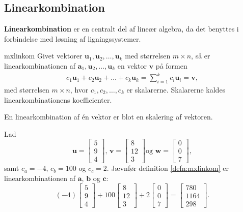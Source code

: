 \subsection{Linearkombination}
%
\textbf{Linearkombination} er en centralt del af lineær algebra, da det benyttes i forbindelse med løsning af ligningssystemer. 
%
\begin{defn}{}{mxlinkom}
Givet vektorer $\mathbf{u}_1, \mathbf{u}_2, \ldots, \mathbf{u}_k$ med størrelsen $m \times n$, så er linearkombinationen af $\mathbf{a}_1, \mathbf{u}_2, \ldots, \mathbf{u}_k$ en vektor $\mathbf{v}$ på formen 
%
\begin{align*}
c_1\mathbf{u}_1+c_2\mathbf{u}_2+\ldots+c_k\mathbf{u}_k=\sum\limits_{i=1}^k c_i\mathbf{u}_i=\mathbf{v},
\end{align*}
%
med størrelsen $m \times n$, hvor $c_1, c_2, \ldots, c_k$ er skalarerne.
Skalarerne kaldes linearkombinationens koefficienter.
\end{defn}
%
%
\noindent 
%
En linearkombination af én vektor er blot en skalering af vektoren.
\\
%
%
\begin{eks}
Lad 
$$
\textbf{u}=
\begin{bmatrix}
5 \\
9 \\
4
\end{bmatrix}
\text{, }
\textbf{v}=
\begin{bmatrix}
8  \\
12 \\ 
3
\end{bmatrix}
\text{og }
\textbf{w}=
\begin{bmatrix}
0 \\
0 \\
7
\end{bmatrix},
$$
samt $c_a=-4$, $c_b=100$ og $c_c=2$. 
Jævnfør definition \ref{defn:mxlinkom} er linearkombinationen af $\textbf{a}$, $\textbf{b}$ og $\textbf{c}$:
$$
(-4)
\begin{bmatrix}
5 \\ 
9 \\ 
4
\end{bmatrix}
+
100
\begin{bmatrix}
8 \\
12 \\ 
3
\end{bmatrix}
+
2
\begin{bmatrix}
0 \\
0 \\ 
7
\end{bmatrix}
=
\begin{bmatrix}
780 \\
1164 \\ 
298
\end{bmatrix}
\text{.}
$$
\end{eks}
